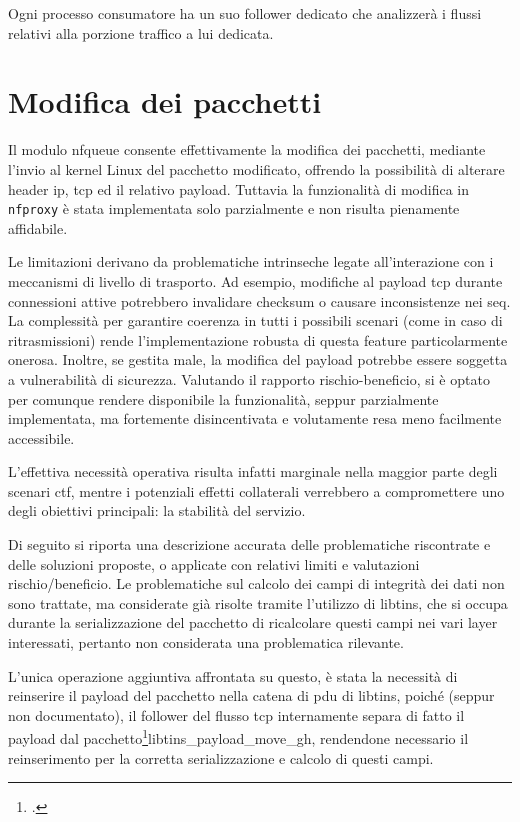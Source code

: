 Ogni processo consumatore ha un suo follower dedicato che analizzerà i flussi relativi alla porzione traffico a lui dedicata.

\section{Modifica dei pacchetti}

Il modulo \gls{nfqueue} consente effettivamente la modifica dei pacchetti, mediante l'invio al kernel Linux del pacchetto modificato, offrendo la possibilità di alterare header
\gls{ip}, \gls{tcp} ed il relativo payload. Tuttavia la funzionalità di modifica in \texttt{nfproxy} è stata implementata solo parzialmente e non risulta pienamente affidabile.

Le limitazioni derivano da problematiche intrinseche legate all’interazione con i meccanismi di livello di trasporto. Ad esempio, modifiche al payload \gls{tcp} durante connessioni attive potrebbero invalidare checksum o causare inconsistenze nei \gls{seq}. La complessità per garantire coerenza in tutti i possibili scenari (come in caso di ritrasmissioni) rende l’implementazione robusta di questa feature particolarmente onerosa. Inoltre, se gestita male, la modifica del payload potrebbe essere soggetta a vulnerabilità di sicurezza. Valutando il rapporto rischio-beneficio, si è optato per comunque rendere disponibile la funzionalità, seppur parzialmente implementata, ma fortemente disincentivata e volutamente resa meno facilmente accessibile.

L’effettiva necessità operativa risulta infatti marginale nella maggior parte degli scenari \gls{ctf}, mentre i potenziali effetti collaterali verrebbero a compromettere uno degli obiettivi principali: la stabilità del servizio.

Di seguito si riporta una descrizione accurata delle problematiche riscontrate e delle soluzioni proposte, o applicate con relativi limiti e valutazioni rischio/beneficio.
Le problematiche sul calcolo dei campi di integrità dei dati non sono trattate, ma considerate già risolte tramite l'utilizzo di libtins, che si occupa durante la serializzazione del pacchetto di ricalcolare questi campi nei vari layer interessati, pertanto non considerata una problematica rilevante.

L'unica operazione aggiuntiva affrontata su questo, è stata la necessità di reinserire il payload del pacchetto nella catena di \gls{pdu} di libtins, poiché (seppur non documentato), il follower del flusso \gls{tcp} internamente separa di fatto il payload dal pacchetto\footcite{Libtins, istruzione per la separazione del payload nel follower (std::move del payload)}{libtins_payload_move_gh}, rendendone necessario il reinserimento per la corretta serializzazione e calcolo di questi campi.

